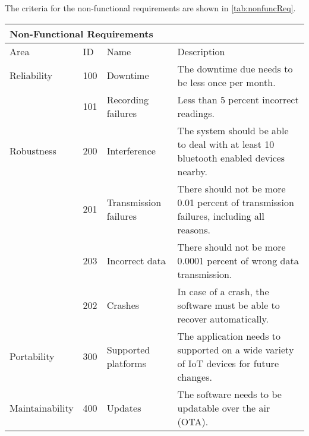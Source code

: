 The criteria for the non-functional requirements are shown in \cref{tab:nonfuncReq}.
    \begin{table}[]
        \begin{tabular}{ l l p{2.5cm} p{7.1cm}}
        \multicolumn{4}{l}{Non-Functional Requirements}                                                                                                                                                    \\ \hline
        Area            & ID  & Name                  & Description                                                                                                                                        \\ \hline
        Reliability     & 100 & Downtime              & The downtime due needs to be less once per month.                                                                                                  \\
                        & 101 & Recording failures    & Less than 5 percent incorrect readings.                                                                                                            \\
        Robustness      & 200 & Interference          & The system should be able to deal with at least 10 bluetooth enabled devices  nearby.                                                              \\
                        & 201 & Transmission failures & There should not be more 0.01 percent of transmission failures, including all reasons.                                                             \\
                        & 203 & Incorrect data        & There should not be more 0.0001 percent of wrong data transmission.                                                                                \\
                        & 202 & Crashes               & In case of a crash, the software must be able to recover automatically.                                                                            \\
        Portability     & 300 & Supported platforms   & The application needs to supported on a wide variety of IoT devices for future changes.                                                            \\
        Maintainability & 400 & Updates               & The software needs to be updatable over the air (OTA).                                                                                             \\

\end{tabular}
\end{table}

